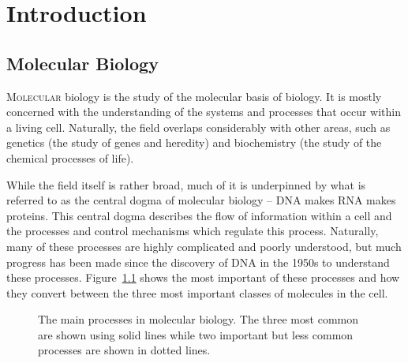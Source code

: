 
\chapter{Introduction}
\label{chap:Introduction} 

\section{Molecular Biology}
\label{sec:MolecularBiology}

\lettrine{M}{olecular} biology is the study of the molecular basis of biology.
It is mostly concerned with the understanding of the systems and processes
that occur within a living cell.
Naturally, the field overlaps considerably with other areas, 
such as genetics (the study of genes and heredity) and biochemistry (the study
of the chemical processes of life).

While the field itself is rather broad, much of it is underpinned by what is
referred to as the central dogma of molecular biology -- 
DNA makes RNA makes proteins.
This central dogma describes the flow of information within a cell and the
processes and control mechanisms which regulate this process.
Naturally, many of these processes are highly complicated and poorly
understood, but much progress has been made since the discovery of DNA in the
1950s to understand these processes.
Figure~\ref{fig:processes} shows the most important of these processes and how
they convert between the three most important classes of molecules in the cell.

\begin{figure}
  \centering
  \caption{The main processes in molecular biology. The three most common are
    shown using solid lines while two important but less common processes are
    shown in dotted lines.
    \label{fig:processes}}
\end{figure}

